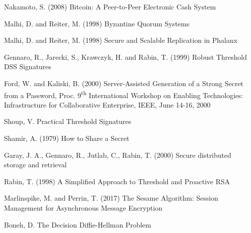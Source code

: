\begin{thebibliography}{99}

  Nakamoto, S. (2008) Bitcoin: A Peer-to-Peer Electronic Cash System

  Malhi, D. and Reiter, M. (1998) Byzantine Quorum Systems

  Malhi, D. and Reiter, M. (1998) Secure and Scalable Replication in Phalanx

  Gennaro, R., Jarecki, S., Krawczyk, H. and Rabin, T. (1999) Robust
  Threshold DSS Signatures

  Ford, W. and Kaliski, B. (2000) Server-Assisted Generation of a
  Strong Secret from a Password, Proc. 9\textsuperscript{th} International
  Workshop on Enabling Technologies: Infrastructure for Collaborative
  Enterprise, IEEE, June 14-16, 2000

\ifdefined\ABSTRACT
\else
{}
  Shoup, V. Practical Threshold Signatures
\fi
  
  Shamir, A. (1979) How to Share a Secret

  Garay, J. A., Gennaro, R., Jutlab, C., Rabin, T. (2000) Secure
  distributed storage and retrieval

  Rabin, T. (1998) A Simplified Approach to Threshold and Proactive RSA

  Marlinspike, M. and Perrin, T. (2017) The Sesame Algorithm: Session Management for Asynchronous Message Encryption

\ifdefined\ABSTRACT
\else
{}
  Boneh, D. The Decision Diffie-Hellman Problem
\fi
  
\end{thebibliography}
